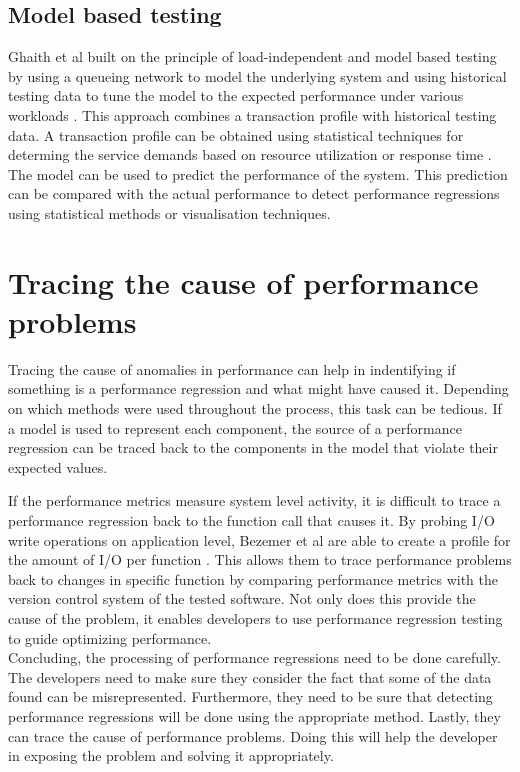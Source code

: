 \subsection{Model based testing}
Ghaith et al built on the principle of load-independent and model based testing by using a queueing network to model the underlying system and using historical testing data to tune the model to the expected performance under various workloads \cite{ghaith2013profile}. This approach combines a transaction profile with historical testing data. A transaction profile can be obtained using statistical techniques for determing the service demands based on resource utilization \cite{casale2008robust} or response time \cite{kraft2009estimating}. The model can be used to predict the performance of the system. This prediction can be compared with the actual performance to detect performance regressions using statistical methods or visualisation techniques.

\section{Tracing the cause of performance problems}
Tracing the cause of anomalies in performance can help in indentifying if something is a performance regression and what might have caused it. Depending on which methods were used throughout the process, this task can be tedious. If a model is used to represent each component, the source of a performance regression can be traced back to the components in the model that violate their expected values.

If the performance metrics measure system level activity, it is difficult to trace a performance regression back to the function call that causes it. By probing I/O write operations on application level, Bezemer et al are able to create a profile for the amount of I/O per function \cite{bezemer2014detecting}. This allows them to trace performance problems back to changes in specific function by comparing performance metrics with the version control system of the tested software. Not only does this provide the cause of the problem, it enables developers to use performance regression testing to guide optimizing performance. \\

Concluding, the processing of performance regressions need to be done carefully. The developers need to make sure they consider the fact that some of the data found can be misrepresented. Furthermore, they need to be sure that detecting performance regressions will be done using the appropriate method. Lastly, they can trace the cause of performance problems. Doing this will help the developer in exposing the problem and solving it appropriately.

